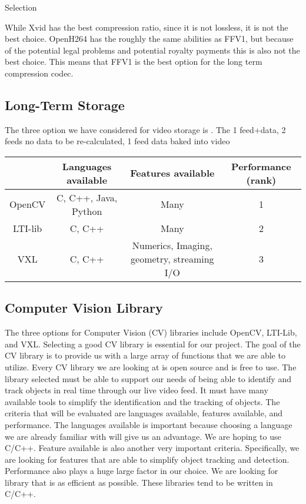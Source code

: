 \documentclass[letterpaper,10pt,onecolumn,draftclsnofoot]{IEEEtran}
\begin{document}
Selection

While Xvid has the best compression ratio, since it is not lossless, it is not the best choice.
OpenH264 has the roughly the same abilities as FFV1, but because of the potential legal problems and potential royalty payments this is also not the best choice.
This means that FFV1 is the best option for the long term compression codec.

\newpage
\subsection{Long-Term Storage} %

The three option we have considered for video storage is .
The 
1 feed+data, 
2 feeds no data to be re-calculated, 
1 feed data baked into video

\begin{center}
	\begin{tabular}{|c|c|c|c|}
		
		\hline
		\textbf{} & \textbf{Languages available} & \textbf{Features available} & \textbf{Performance (rank)} \\
		\hline
		OpenCV & C, C++, Java, Python & Many & 1 \\
		\hline
		LTI-lib & C, C++ & Many & 2 \\
		\hline
		VXL & C, C++ & Numerics, Imaging, geometry, streaming I/O & 3 \\
		\hline
		
	\end{tabular}
\end{center}

\newpage
\subsection{Computer Vision Library} %
The three options for Computer Vision (CV) libraries include OpenCV, LTI-Lib, and VXL.
Selecting a good CV library is essential for our project.
The goal of the CV library is to provide us with a large array of functions that we are able to utilize.
Every CV library we are looking at is open source and is free to use.
The library selected must be able to support our needs of being able to identify and track objects in real time through our live video feed.
It must have many available tools to simplify the identification and the tracking of objects.
The criteria that will be evaluated are languages available, features available, and performance.
The languages available is important because choosing a language we are already familiar with will give us an advantage.
We are hoping to use C/C++.
Feature available is also another very important criteria.
Specifically, we are looking for features that are able to simplify object tracking and detection.
Performance also plays a huge large factor in our choice.
We are looking for library that is as efficient as possible.
These libraries tend to be written in C/C++.
\end{document}
